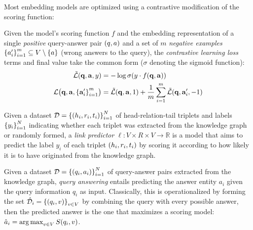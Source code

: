 Most embedding models are optimized using a contrastive modification of the scoring function:
\begin{definition}
\label{def:contrastive_loss}
    Given the model's scoring function $f$ and the embedding representation of a single \emph{positive} query-answer pair $\mathopen{}\left(q, a\right)$ and a set of $m$ \emph{negative examples} $\mathopen{}\left\{a'_i\right\}_{i=1}^{m} \subseteq V \setminus \mathopen{}\left\{a\right\}$ (wrong answers to the query), the \emph{contrastive learning loss} terms and final value take the common form ($\sigma$ denoting the sigmoid function):
    \begin{align}
    \begin{aligned}
    \label{eq:contrastive_loss}
        \tilde{\mathcal{L}}\mathopen{}\left(\mathbf{q}, \mathbf{a}, y\right)&=-\log{\sigma{\mathopen{}\left(y \cdot f\mathopen{}\left(\mathbf{q},\mathbf{a}\right)\right)}}\\
        \mathcal{L}\mathopen{}\left(\mathbf{q}, \mathbf{a}, \mathopen{}\left\{\mathbf{a}'_i\right\}_{i=1}^{m}\right)&=\tilde{\mathcal{L}}\mathopen{}\left(\mathbf{q}, \mathbf{a}, 1\right) + \frac{1}{m}\sum_{i=1}^{m}{\tilde{\mathcal{L}}\mathopen{}\left(\mathbf{q}, \mathbf{a}'_i, -1\right)}
        \end{aligned}
    \end{align}
\end{definition}

\begin{definition}
    Given a dataset $\mathcal{D}=\mathopen{}\left\{\mathopen{}\left(h_i, r_i, t_i\right)\right\}_{i=1}^{N}$ of head-relation-tail triplets and labels $\mathopen{}\left\{y_i\right\}_{i=1}^{N}$ indicating whether each triplet was extracted from the knowledge graph or randomly formed, a \emph{link predictor} $\ell: V \times R \times V \to \mathbb{R}$ is a model that aims to predict the label $y_i$ of each triplet $\mathopen{}\left(h_i,r_i,t_i\right)$ by scoring it according to how likely it is to have originated from the knowledge graph.
\end{definition}


\begin{definition}
    Given a dataset $\mathcal{D}=\mathopen{}\left\{\mathopen{}\left(q_i, a_i\right)\right\}_{i=1}^{N}$ of query-answer pairs extracted from the knowledge graph, \emph{query answering} entails predicting the answer entity $a_i$ given the query information $q_i$ as input. Classically, this is operationalized by forming the set $\hat{\mathcal{D}}_i=\mathopen{}\left\{\mathopen{}\left(q_i, v\right)\right\}_{v \in V}$ by combining the query with every possible answer, then the predicted answer is the one that maximizes a scoring model: $\hat{a}_i = \operatorname*{arg\,max}_{v \in V}{S\mathopen{}\left(q_i,v\right)}$.
\end{definition}

